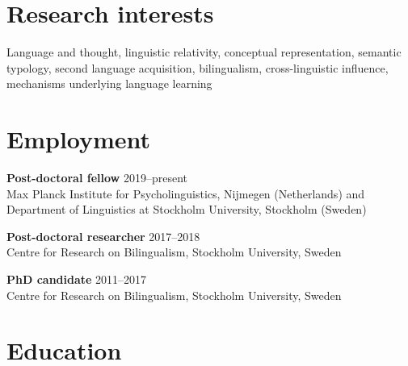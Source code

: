 \documentclass[margin, 11pt]{res} %
\begin{document}
\begin{resume}

% 
%

\section{\sc Research interests}
Language and thought, linguistic relativity,
conceptual representation, semantic typology,
second language acquisition, bilingualism,
cross-linguistic influence, 
mechanisms underlying language learning
\\




\section{\sc Employment}

{\bf Post-doctoral fellow} \hfill 2019--present\\ 
Max Planck Institute for Psycholinguistics, Nijmegen (Netherlands) and
Department of Linguistics at Stockholm University, Stockholm (Sweden)


{\bf Post-doctoral researcher} \hfill 2017--2018\\
Centre for Research on Bilingualism, Stockholm University, Sweden
 
{\bf PhD candidate} \hfill 2011--2017\\
Centre for Research on Bilingualism, Stockholm University, Sweden
 
 


\section{\sc Education}


\end{resume}
\end{document}

